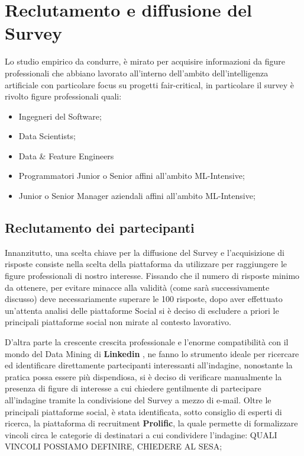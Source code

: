     \section{Reclutamento e diffusione del Survey}
    
    Lo studio empirico da condurre, è mirato per acquisire informazioni da figure professionali che abbiano lavorato all'interno dell'ambito dell'intelligenza artificiale con particolare focus su progetti fair-critical, in particolare il survey è rivolto figure professionali quali:
    
        \begin{itemize}
            \item Ingegneri del Software;
            \item Data Scientists;
            \item Data \& Feature Engineers
            \item Programmatori Junior o Senior affini all'ambito ML-Intensive;
            \item Junior o Senior Manager aziendali affini all'ambito ML-Intensive;
        \end{itemize}
        
    \subsection{Reclutamento dei partecipanti}
    
    Innanzitutto, una scelta chiave per la diffusione del Survey e l'acquisizione di risposte consiste nella scelta della piattaforma da utilizzare per raggiungere le figure professionali di nostro interesse. Fissando che il numero di risposte minimo da ottenere, per evitare minacce alla validità (come sarà successivamente discusso) deve necessariamente superare le 100 risposte, dopo aver effettuato un'attenta analisi delle piattaforme Social si è deciso di escludere a priori le principali piattaforme social non mirate al contesto lavorativo. 
    
    D'altra parte la crescente crescita professionale e l'enorme compatibilità con il mondo del Data Mining di \textbf{Linkedin} \cite{sumbaly2013big}, ne fanno lo strumento ideale per ricercare ed identificare direttamente partecipanti interessanti all'indagine, nonostante la pratica possa essere più dispendiosa, si è deciso di verificare manualmente la presenza di figure di interesse a cui chiedere gentilmente di partecipare all'indagine tramite la condivisione del Survey a mezzo di e-mail.  Oltre le principali piattaforme social, è stata identificata, sotto consiglio di esperti di ricerca, la piattaforma di recruitment \textbf{Prolific}, la quale permette di formalizzare vincoli circa le categorie di destinatari a cui condividere l'indagine: QUALI VINCOLI POSSIAMO DEFINIRE, CHIEDERE AL SESA;\\
    
